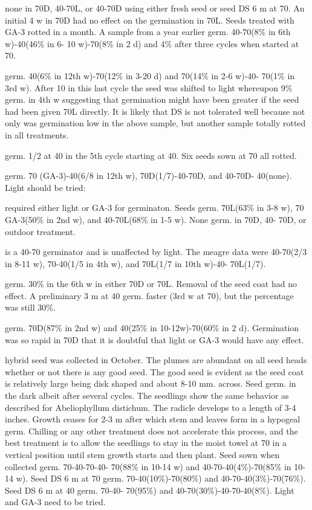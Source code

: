\begin{description}
none in 70D, 40-70L, or 40-70D using either fresh seed or seed DS 6 m at 70. An
initial 4 w in 70D had no effect on the germination in 70L. Seeds treated with GA-3
rotted in a month. A sample from a year earlier germ. 40-70(8\% in 6th w)-40(46\% in 6-
10 w)-70(8\% in 2 d) and 4\% after three cycles when started at 70.
\item [C. connata] germ. 40(6\% in 12th w)-70(12\% in 3-20 d) and 70(14\% in 2-6 w)-40-
70(1\% in 3rd w). After 10 in this last cycle the seed was shifted to light whereupon
9\% germ. in 4th w suggesting that germination might have been greater if the seed
had been given 70L directly. It is likely that DS is not tolerated well because not only
was germination low in the above sample, but another sample totally rotted in all
treatments.
\item [C. crispa] germ. 1/2 at 40 in the 5th cycle starting at 40. Six seeds sown at 70 all
rotted.
\item [C. forsteri] germ. 70 (GA-3)-40(6/8 in 12th w), 70D(1/7)-40-70D, and 40-70D-
40(none). Light should be tried:

\item [C. grata] required either light or GA-3 for germinaton. Seeds germ. 70L(63\% in
3-8 w), 70 GA-3(50\% in 2nd w), and 40-70L(68\% in 1-5 w). None germ. in 70D, 40-
70D, or outdoor treatment.
\item [C. hirsutissima] is a 40-70 germinator and is unaffected by light. The meagre
data were 40-70(2/3 in 8-11 w), 70-40(1/5 in 4th w), and 70L(1/7 in 10th w)-40-
70L(1/7).
\item [C. integrifolia] germ. 30\% in the 6th w in either 70D or 70L. Removal of the seed
coat had no effect. A preliminary 3 m at 40 germ. faster (3rd w at 70), but the
percentage was still 30\%.
\item [C. ladakhiana] germ. 70D(87\% in 2nd w) and 40(25\% in 10-12w)-70(60\% in 2
d). Germination was so rapid in 70D that it is doubtful that light or GA-3 would have
any effect.
\item [C. lanuginosa] hybrid seed was collected in October. The plumes are abundant
on all seed heads whether or not there is any good seed. The good seed is evident as
the seed coat is relatively large being disk shaped and about 8-10 mm. across. Seed
germ. in the dark albeit after several cycles. The seedlings show the same behavior
as described for Abeliophyllum distichum. The radicle develops to a length of 3-4
inches. Growth ceases for 2-3 m after which stem and leaves form in a hypogeal
germ. Chilling or any other treatment does not accelerate this process, and the best
treatment is to allow the seedlings to stay in the moist towel at 70 in a vertical position
until stem growth starts and then plant. Seed sown when collected germ. 70-40-70-40-
70(88\% in 10-14 w) and 40-70-40(4\%)-70(85\% in 10-14 w). Seed DS 6 m at 70 germ.
70-40(10\%)-70(80\%) and 40-70-40(3\%)-70(76\%). Seed DS 6 m at 40 germ. 70-40-
70(95\%) and 40-70(30\%)-40-70-40(8\%). Light and GA-3 need to be tried.


\end{description}
